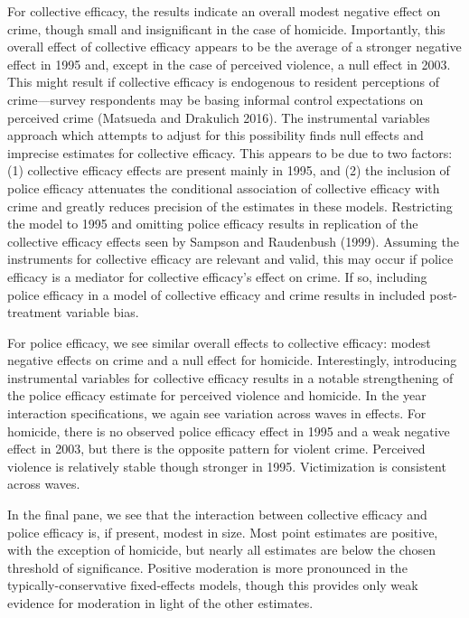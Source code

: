 \documentclass [11pt, proquest] {uwthesis}[2015/03/03]
\begin{document}
For collective efficacy, the results indicate an overall modest negative effect on crime, though small and insignificant in the case of homicide. Importantly, this overall effect of collective efficacy appears to be the average of a stronger negative effect in 1995 and, except in the case of perceived violence, a null effect in 2003. This might result if collective efficacy is endogenous to resident perceptions of crime---survey respondents may be basing informal control expectations on perceived crime (Matsueda and Drakulich 2016). The instrumental variables approach which attempts to adjust for this possibility finds null effects and imprecise estimates for collective efficacy. This appears to be due to two factors: (1) collective efficacy effects are present mainly in 1995, and (2) the inclusion of police efficacy attenuates the conditional association of collective efficacy with crime and greatly reduces precision of the estimates in these models. Restricting the model to 1995 and omitting police efficacy results in replication of the collective efficacy effects seen by Sampson and Raudenbush (1999). Assuming the instruments for collective efficacy are relevant and valid, this may occur if police efficacy is a mediator for collective efficacy's effect on crime. If so, including police efficacy in a model of collective efficacy and crime results in included post-treatment variable bias.

For police efficacy, we see similar overall effects to collective efficacy: modest negative effects on crime and a null effect for homicide. Interestingly, introducing instrumental variables for collective efficacy results in a notable strengthening of the police efficacy estimate for perceived violence and homicide. In the year interaction specifications, we again see variation across waves in effects. For homicide, there is no observed police efficacy effect in 1995 and a weak negative effect in 2003, but there is the opposite pattern for violent crime. Perceived violence is relatively stable though stronger in 1995. Victimization is consistent across waves.

In the final pane, we see that the interaction between collective efficacy and police efficacy is, if present, modest in size. Most point estimates are positive, with the exception of homicide, but nearly all estimates are below the chosen threshold of significance. Positive moderation is more pronounced in the typically-conservative fixed-effects models, though this provides only weak evidence for moderation in light of the other estimates.
\end{document}
